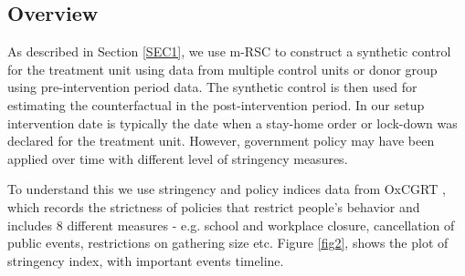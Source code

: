 \documentclass[preprint,authoryear,12pt]{elsarticle}
\begin{document}
	\subsection{Overview}
	As described in Section \ref{SEC1}, we use m-RSC to construct a synthetic control for the treatment unit using data from multiple control units or donor group using pre-intervention period data.  The synthetic control is then used for estimating the counterfactual in the post-intervention period. In our setup intervention date is typically the date when a stay-home order or lock-down was declared for the treatment unit.  However, government policy may have been applied over time with different level of stringency measures. 
	
	To understand this we use stringency and policy indices data from OxCGRT \cite{HWP2020}, which records the strictness of policies that restrict people’s behavior and includes 8 different measures - e.g. school  and workplace closure, cancellation of public events, restrictions on gathering size etc. Figure \ref{fig2}, shows the plot of stringency index, with important events timeline. 
	
\end{document}
